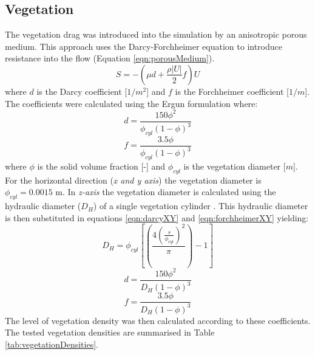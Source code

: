 \documentclass[../main.tex]{subfiles}
\begin{document}
\subsection{Vegetation}
The vegetation drag was introduced into the simulation by an anisotropic porous medium. This approach uses the Darcy-Forchheimer equation to introduce resistance into the flow (Equation \ref{eqn:porousMedium}). 
\begin{equation}
S=- \left ( \mu d +\frac{\rho |U|}{2}f \right ) U
\label{eqn:porousMedium}
\end{equation}
where $d$ is the Darcy coefficient [$1/m^2$] and $f$ is the Forchheimer coefficient [$1/m$]. The coefficients were calculated using the Ergun formulation where:
\begin{equation}
d=\frac{150\phi^2}{\phi_{cyl}(1-\phi)^3}
\label{eqn:darcyXY}
\end{equation}
\begin{equation}
f=\frac{3.5\phi}{\phi_{cyl}(1-\phi)^3}
\label{eqn:forchheimerXY}
\end{equation}
where $\phi$ is the solid volume fraction [-] and  $\phi_{cyl}$ is the vegetation diameter [$m$]. For the horizontal direction (\textit{x and y axis}) the vegetation diameter is $\phi_{cyl}=0.0015$ m. In \textit{z-axis} the vegetation diameter is calculated using the hydraulic diameter ($D_H$) of a single vegetation cylinder \cite{oldham2001}. This hydraulic diameter is then substituted in equations \ref{eqn:darcyXY} and \ref{eqn:forchheimerXY} yielding:
\begin{equation}
D_H=\phi_{cyl}\left[\left(\frac{4\left(\frac{s}{\phi_{cyl}} \right )^2}{\pi} \right )-1 \right ]
\end{equation}
\begin{equation}
d=\frac{150\phi^2}{D_H(1-\phi)^3}
\label{eqn:darcyZ}
\end{equation}
\begin{equation}
f=\frac{3.5\phi}{D_H(1-\phi)^3}
\label{eqn:forchheimerZ}
\end{equation}
The level of vegetation density was then calculated according to these coefficients. The tested vegetation densities are summarised in Table \ref{tab:vegetationDensities}.
\end{document}
